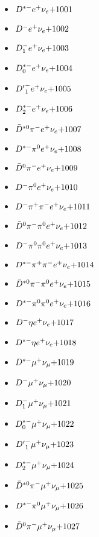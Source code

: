 
 \begin{multicols}{3} 
 \begin{itemize}
 \item $ D^{*-} e^{+} \nu_{e} \hfill{+1001}$
 \item $ D^{-} e^{+} \nu_{e} \hfill{+1002}$
 \item $ D_{1}^{-} e^{+} \nu_{e} \hfill{+1003}$
 \item $ D_{0}^{*-} e^{+} \nu_{e} \hfill{+1004}$
 \item $ {D^{\prime}}_{1}^{-} e^{+} \nu_{e} \hfill{+1005}$
 \item $ D_{2}^{*-} e^{+} \nu_{e} \hfill{+1006}$
 \item $ \bar{D}^{*0} \pi^{-} e^{+} \nu_{e} \hfill{+1007}$
 \item $ D^{*-} \pi^{0} e^{+} \nu_{e} \hfill{+1008}$
 \item $ \bar{D}^{0} \pi^{-} e^{+} \nu_{e} \hfill{+1009}$
 \item $ D^{-} \pi^{0} e^{+} \nu_{e} \hfill{+1010}$
 \item $ D^{-} \pi^{+} \pi^{-} e^{+} \nu_{e} \hfill{+1011}$
 \item $ \bar{D}^{0} \pi^{-} \pi^{0} e^{+} \nu_{e} \hfill{+1012}$
 \item $ D^{-} \pi^{0} \pi^{0} e^{+} \nu_{e} \hfill{+1013}$
 \item $ D^{*-} \pi^{+} \pi^{-} e^{+} \nu_{e} \hfill{+1014}$
 \item $ \bar{D}^{*0} \pi^{-} \pi^{0} e^{+} \nu_{e} \hfill{+1015}$
 \item $ D^{*-} \pi^{0} \pi^{0} e^{+} \nu_{e} \hfill{+1016}$
 \item $ D^{-} \eta e^{+} \nu_{e} \hfill{+1017}$
 \item $ D^{*-} \eta e^{+} \nu_{e} \hfill{+1018}$
 \item $ D^{*-} \mu^{+} \nu_{\mu} \hfill{+1019}$
 \item $ D^{-} \mu^{+} \nu_{\mu} \hfill{+1020}$
 \item $ D_{1}^{-} \mu^{+} \nu_{\mu} \hfill{+1021}$
 \item $ D_{0}^{*-} \mu^{+} \nu_{\mu} \hfill{+1022}$
 \item $ {D^{\prime}}_{1}^{-} \mu^{+} \nu_{\mu} \hfill{+1023}$
 \item $ D_{2}^{*-} \mu^{+} \nu_{\mu} \hfill{+1024}$
 \item $ \bar{D}^{*0} \pi^{-} \mu^{+} \nu_{\mu} \hfill{+1025}$
 \item $ D^{*-} \pi^{0} \mu^{+} \nu_{\mu} \hfill{+1026}$
 \item $ \bar{D}^{0} \pi^{-} \mu^{+} \nu_{\mu} \hfill{+1027}$

\end{itemize}
\end{multicols}
